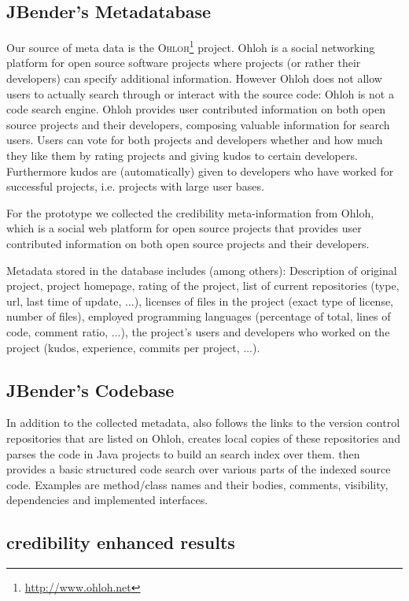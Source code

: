 \subsection{JBender's Metadatabase}
Our source of meta data is the \textsc{Ohloh}\footnote{\url{http://www.ohloh.net}} project. Ohloh is a social networking platform for open source software projects where projects (or rather their developers) can specify additional information. However Ohloh does not allow users to actually search through or interact with the source code: Ohloh is not a code search engine. Ohloh provides user contributed information on both open source projects and their developers, composing valuable information for search users. Users can vote for both projects and developers whether and how much they like them by rating projects and giving kudos to certain developers. Furthermore kudos are (automatically) given to developers who have worked for successful projects, i.e. projects with large user bases. 

For the \Jbd prototype we collected the credibility meta-information from Ohloh, which is a social web platform for open source projects that provides user contributed information on both open source projects and their developers.

Metadata stored in the database includes (among others): Description of original project, project homepage, rating of the project, list of current repositories (type, url, last time of update, ...), licenses of files in the project (exact type of license, number of files), employed programming languages (percentage of total, lines of code, comment ratio, ...), the project's users and developers who worked on the project (kudos, experience, commits per project, ...).

\subsection{JBender's Codebase}
In addition to the collected metadata, \Jbd also follows the links to the version control repositories that are listed on Ohloh, creates local copies of these repositories and parses the code in Java projects to build an search index over them.
\Jbd then provides a basic structured code search over various parts of the indexed source code. Examples are method/class names and their bodies, comments, visibility, dependencies and implemented interfaces.

\subsection{credibility enhanced results}


